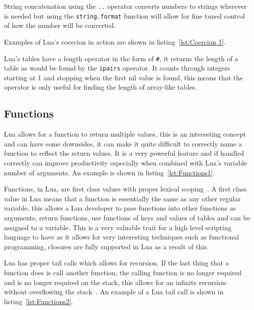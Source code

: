 \documentclass[11pt,a4paper,titlepage]{report}
\begin{document}
	String concatenation using the \texttt{..} operator converts numbers to strings wherever is needed but using the \texttt{string.format} function will allow for fine tuned control of how the number will be converted.

	Examples of Lua's coercion in action are shown in listing~\ref{lst:Coercion 1}.
	

	Lua's tables have a length operator in the form of \texttt{\#}, it returns the length of a table as would be found by the \texttt{ipairs} operator. It counts through integers starting at 1 and stopping when the first nil value is found, this means that the operator is only useful for finding the length of array-like tables.

\subsection{Functions}
	Lua allows for a function to return multiple values, this is an interesting concept and can have some downsides, it can make it quite difficult to correctly name a function to reflect the return values. It is a very powerful feature and if handled correctly can improve productivity especially when combined with Lua's variable number of arguments. An example is shown in listing~\ref{lst:Functions1}.
	

	Functions, in Lua, are first class values with proper lexical scoping~\cite{Ierusalimschy:2013:PLT:2502646}. A first class value in Lua means that a function is essentially the same as any other regular variable, this allows a Lua developer to pass functions into other functions as arguments, return functions, use functions of keys and values of tables and can be assigned to a variable. This is a very valuable trait for a high level scripting language to have as it allows for very interesting techniques such as functional programming, closures are fully supported in Lua as a result of this.

	Lua has proper tail calls which allows for recursion. If the last thing that a function does is call another function, the calling function is no longer required and is no longer required on the stack, this allows for an infinite recursion without overflowing the stack~\cite{Ierusalimschy:2013:PLT:2502646}. An example of a Lua tail call is shown in listing~\ref{lst:Functions2}.
	
\end{document}
